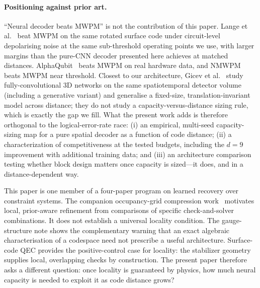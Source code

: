 \documentclass[11pt,a4paper]{article}
\begin{document}
\paragraph{Positioning against prior art.}
``Neural decoder beats MWPM'' is not the contribution of this paper.
Lange et al.~\cite{lange2025gnn} beat MWPM on the same rotated surface
code under circuit-level depolarising noise at the same sub-threshold
operating points we use, with larger margins than the pure-CNN decoder
presented here achieves at matched distances. AlphaQubit~\cite{bausch2024alphaqubit}
beats MWPM on real hardware data, and NMWPM~\cite{peled2026nmwpm} beats
MWPM near threshold. Closest to our architecture, Gicev et
al.~\cite{gicev2025fcn} study fully-convolutional 3D networks on the
same spatiotemporal detector volume (including a generative variant) and
generalise a fixed-size, translation-invariant model across distance;
they do not study a capacity-versus-distance sizing rule, which is exactly
the gap we fill. What the present work adds is therefore orthogonal to the
logical-error-rate race: (i) an empirical, multi-seed capacity-sizing map
for a pure spatial decoder as a function of code distance; (ii) a characterization of competitiveness at the tested budgets,
including the $d=9$ improvement with additional training data; and (iii) an architecture comparison testing whether
block design matters once capacity is sized---it does, and in a
distance-dependent way.

This paper is one member of a four-paper program on learned recovery over
constraint systems. The companion occupancy-grid compression
work~\cite{guarraci2026compression} motivates local, prior-aware
refinement from comparisons of specific check-and-solver combinations.
It does not establish a universal locality condition. The gauge-structure note shows the complementary warning that an
exact algebraic characterisation of a codespace need not prescribe a useful
architecture. Surface-code QEC provides the positive-control case for locality:
the stabilizer geometry supplies local, overlapping checks by construction.
The present paper therefore asks a different question: once locality is
guaranteed by physics, how much neural capacity is needed to exploit it as
code distance grows?
\end{document}
